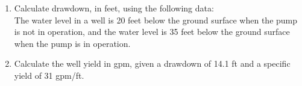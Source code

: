 \begin{enumerate}[1.]
\item Calculate drawdown, in feet, using the following data:\\
The water level in a well is 20 feet below the ground surface when the pump is not in operation, and the water level is 35 feet below the ground surface when the pump is in operation.\\


\item Calculate the well yield in gpm, given a drawdown of 14.1 ft and a specific yield of 31
gpm/ft.\\






\end{enumerate}


